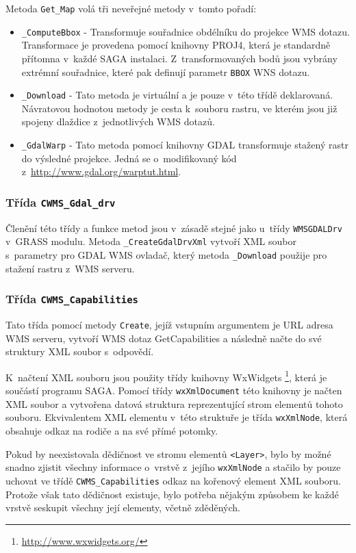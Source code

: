 \documentclass[a4paper,12pt]{article}
\begin{document}
Metoda {\tt Get\_Map} volá tři neveřejné metody v~tomto pořadí:
\begin{itemize}
 \item {\tt \_ComputeBbox} - Transformuje souřadnice obdélníku do
   projekce WMS dotazu.
   Transformace je provedena pomocí knihovny PROJ4, která je 
   standardně přítomna v~každé SAGA instalaci. Z~transformovaných 
   bodů jsou vybrány extrémní souřadnice, které pak definují 
   parametr {\tt BBOX} WNS dotazu.
 \item {\tt \_Download} - Tato metoda je virtuální a je pouze v~této třídě
   deklarovaná.  Návratovou hodnotou metody je cesta k~souboru
   rastru, ve kterém jsou již spojeny dlaždice z~jednotlivých WMS
   dotazů.
 \item {\tt \_GdalWarp} - Tato metoda pomocí knihovny GDAL transformuje 
   stažený rastr do výsledné projekce. Jedná se
   o~modifikovaný kód z~\url{http://www.gdal.org/warptut.html}.
\end{itemize}

\subsubsection{Třída {\tt CWMS\_Gdal\_drv}}


Členění této třídy a funkce metod jsou v~zásadě stejné jako
u~třídy {\tt WMSGDALDrv} v~GRASS modulu. Metoda {\tt \_CreateGdalDrvXml} vytvoří XML
soubor s~parametry pro GDAL WMS ovladač, který metoda {\tt \_Download}
použije pro stažení rastru z~WMS serveru.


\subsubsection{Třída {\tt CWMS\_Capabilities}}

Tato třída pomocí metody {\tt Create}, jejíž vstupním argumentem je URL 
adresa WMS serveru, vytvoří WMS dotaz GetCapabilities a následně
načte do své struktury XML soubor s~odpovědí.

K~načtení XML souboru jsou použity třídy knihovny WxWidgets \footnote{\url{http://www.wxwidgets.org/}}, která je
součástí programu SAGA. Pomocí třídy {\tt wxXmlDocument} této knihovny je
načten XML soubor a vytvořena datová struktura reprezentující strom
elementů tohoto souboru. Ekvivalentem XML elementu v~této struktuře 
je třída {\tt wxXmlNode}, která obsahuje odkaz na rodiče a na své přímé potomky.

Pokud by neexistovala dědičnost ve stromu elementů {\tt <Layer>}, bylo by
možné snadno zjistit všechny informace o~vrstvě z~jejího {\tt wxXmlNode} a
stačilo by pouze uchovat ve třídě {\tt CWMS\_Capabilities} odkaz na kořenový
element XML souboru. Protože však tato dědičnost existuje, bylo
potřeba nějakým způsobem ke každé vrstvě seskupit všechny její
elementy, včetně zděděných.
  
\end{document}
